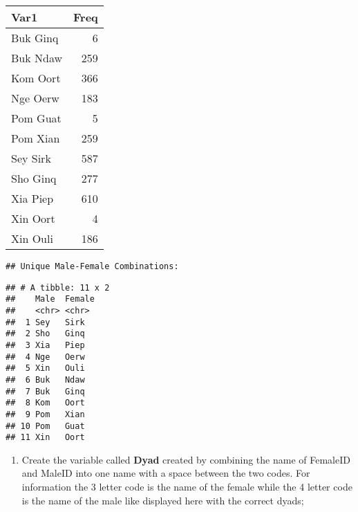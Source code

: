 \documentclass[
]{article}
\providecommand{\tightlist}{%
  \setlength{\itemsep}{0pt}\setlength{\parskip}{0pt}}
\begin{document}
\begin{longtable}[]{@{}lr@{}}
\toprule
Var1 & Freq \\
\midrule
\endhead
Buk Ginq & 6 \\
Buk Ndaw & 259 \\
Kom Oort & 366 \\
Nge Oerw & 183 \\
Pom Guat & 5 \\
Pom Xian & 259 \\
Sey Sirk & 587 \\
Sho Ginq & 277 \\
Xia Piep & 610 \\
Xin Oort & 4 \\
Xin Ouli & 186 \\
\bottomrule
\end{longtable}

\begin{verbatim}
## Unique Male-Female Combinations:
\end{verbatim}

\begin{verbatim}
## # A tibble: 11 x 2
##    Male  Female
##    <chr> <chr> 
##  1 Sey   Sirk  
##  2 Sho   Ginq  
##  3 Xia   Piep  
##  4 Nge   Oerw  
##  5 Xin   Ouli  
##  6 Buk   Ndaw  
##  7 Buk   Ginq  
##  8 Kom   Oort  
##  9 Pom   Xian  
## 10 Pom   Guat  
## 11 Xin   Oort
\end{verbatim}

\begin{enumerate}
\def\labelenumi{\arabic{enumi}.}
\setcounter{enumi}{1}
\tightlist
\item
  Create the variable called \textbf{Dyad} created by combining the name
  of FemaleID and MaleID into one name with a space between the two
  codes. For information the 3 letter code is the name of the female
  while the 4 letter code is the name of the male like displayed here
  with the correct dyads;
\end{enumerate}
\end{document}
